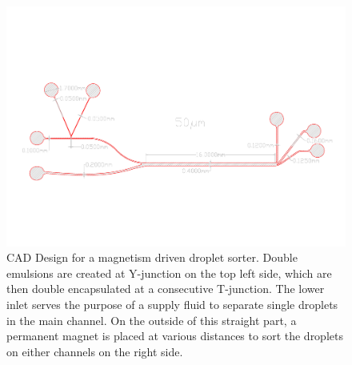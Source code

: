 	\begin{landscape}
	\begin{figure}
		\centering
		\includegraphics[clip,trim={10mm 50mm 10mm 50mm},scale=.85]{Ressourcen/IMG/Microfluidics_Prototype_3_2018412-Sorter_compl}
		\caption{CAD Design for a magnetism driven droplet sorter. Double emulsions are created at Y-junction on the top left side, which are then double encapsulated at a consecutive T-junction. The lower inlet serves the purpose of a supply fluid to separate single droplets in the main channel. On the outside of this straight part, a permanent magnet is placed at various distances to sort the droplets on either channels on the right side.}
		\label{fig:CAD:sorter}
		
	\end{figure}
\end{landscape}



\printacronyms[title={List of Abbreviations}]
{}
\clearpage
\newpage\null\thispagestyle{empty}\newpage
\listoffigures %


